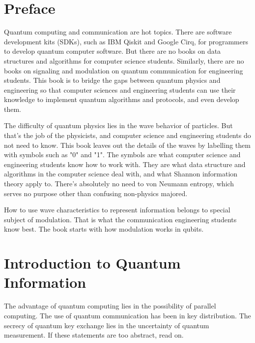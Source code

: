 \documentclass{book}
\begin{document}
\addtocounter{page}{2}

\chapter*{Preface}
Quantum computing and communication are hot topics. There are software development kits (SDKs), such as IBM Qiskit and Google Cirq, for programmers to develop quantum computer software. But there are no books on data structures and algorithms for computer science students. Similarly, there are no books on signaling and modulation on quantum communication for engineering students. This book is to bridge the gaps between quantum physics and engineering so that computer sciences and engineering students can use their knowledge to implement quantum algorithms and protocols, and even develop them.

The difficulty of quantum physics lies in the wave behavior of particles. But that's the job of the physicists, and computer science and engineering students do not need to know. This book leaves out the details of the waves by labelling them with symbols such as "0" and "1". The symbols are what computer science and engineering students know how to work with. They are what data structure and algorithms in the computer science deal with, and what Shannon information theory apply to. There's absolutely no need to von Neumann entropy, which serves no purpose other than confusing non-physics majored.

How to use wave characteristics to represent information belongs to special subject of modulation. That is what  the communication engineering students know best. The book starts with how modulation works in qubits.

\setcounter{tocdepth}{3}
\tableofcontents

\mainmatter

\chapter{Introduction to Quantum Information}
The advantage of quantum computing lies in the possibility of parallel computing. The use of quantum communication has been in key distribution. The secrecy of quantum key exchange lies in the uncertainty of quantum measurement. If these statements are too abstract, read on.
\end{document}
